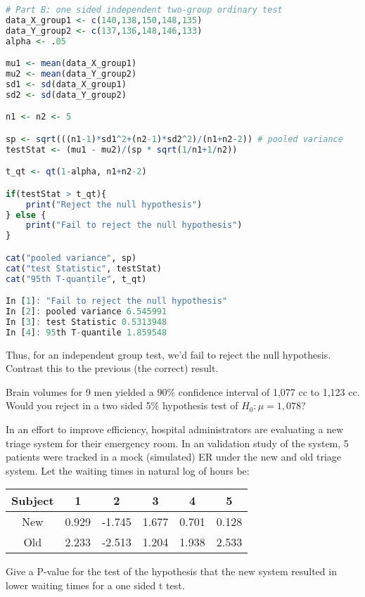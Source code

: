 \documentclass{homework}
\begin{document}
\begin{lstlisting}[language=R]
# Part B: one sided independent two-group ordinary test 
data_X_group1 <- c(140,138,150,148,135)
data_Y_group2 <- c(137,136,148,146,133)
alpha <- .05

mu1 <- mean(data_X_group1)
mu2 <- mean(data_Y_group2)
sd1 <- sd(data_X_group1)
sd2 <- sd(data_Y_group2)

n1 <- n2 <- 5 

sp <- sqrt(((n1-1)*sd1^2+(n2-1)*sd2^2)/(n1+n2-2)) # pooled variance
testStat <- (mu1 - mu2)/(sp * sqrt(1/n1+1/n2))

t_qt <- qt(1-alpha, n1+n2-2)

if(testStat > t_qt){
    print("Reject the null hypothesis")
} else {
    print("Fail to reject the null hypothesis")
}

cat("pooled variance", sp)
cat("test Statistic", testStat)
cat("95th T-quantile", t_qt)

In [1]: "Fail to reject the null hypothesis"
In [2]: pooled variance 6.545991
In [3]: test Statistic 0.5313948
In [4]: 95th T-quantile 1.859548
\end{lstlisting}

Thus, for an independent group test, we'd fail to reject the null hypothesis. Contrast this to the previous (the correct) result. \\

\begin{tcolorbox}[title=Question 3]
Brain volumes for 9 men yielded a 90\% confidence interval of 1,077 cc to 1,123 cc. Would you reject in a two sided 5\% hypothesis test of $H_0: \mu=1,078$? 
\end{tcolorbox}

\begin{tcolorbox}[title=Question 4]
In an effort to improve efficiency, hospital administrators are evaluating a new triage system for their emergency room. In an validation study of the system, 5 patients were tracked in a mock (simulated) ER under the new and old triage system. Let the waiting times in natural log of hours be:

\begin{center}
\begin{tabular}{ |c|c|c|c|c|c| } 
\hline
 Subject & 1 & 2 & 3 & 4 & 5 \\ [0.5ex]
 \hline
 New & 0.929 & -1.745 & 1.677 & 0.701 & 0.128 \\ 
 Old & 2.233 & -2.513 & 1.204 & 1.938 & 2.533 \\
 \hline
\end{tabular}
\end{center}

Give a P-value for the test of the hypothesis that the new system resulted in lower waiting times for a one sided t test.
\end{tcolorbox}
\end{document}
